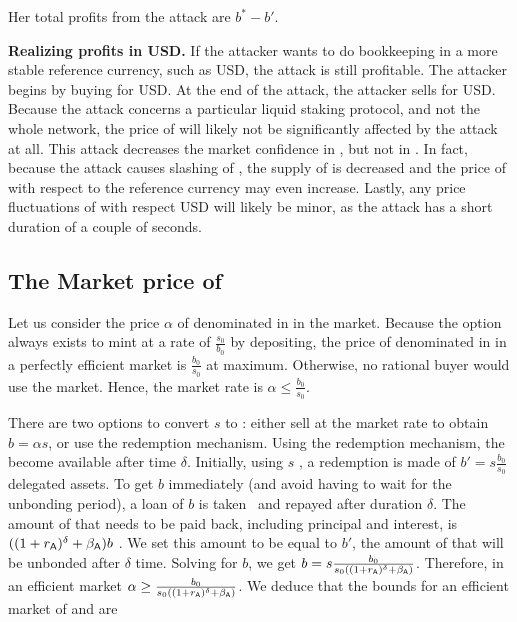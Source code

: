 Her total profits from the attack are $b^* - b'$.

\noindent
\textbf{Realizing profits in USD.}
If the attacker wants to do bookkeeping in a more stable reference currency,
such as USD, the attack is still profitable. The attacker begins by buying
\asset for USD. At the end of the attack, the attacker sells \asset for USD.
Because the attack concerns a particular liquid staking protocol, and
not the whole \asset network, the price of \asset will likely not
be significantly affected by the attack at all.
This attack decreases the market confidence in \stasset,
but not in \asset.
In fact, because
the attack causes slashing of \asset, the supply of \asset is decreased
and the price of \asset with respect to the reference currency may
even increase.
Lastly, any price fluctuations of \asset with respect USD will likely be
minor, as the attack has a short duration of a couple of seconds.



\subsection{The Market price of \stasset}\label{sec:stasset-price}

Let us consider the price $\alpha$ of \stasset denominated in \asset in the market.
Because the option always exists to mint at a rate of $\frac{s_0}{b_0}$ by
depositing, the price of \stasset denominated in \asset in a perfectly
efficient market is $\frac{b_0}{s_0}$ at maximum. Otherwise, no
rational buyer would use the market. Hence, the market rate is
$\alpha \leq \frac{b_0}{s_0}$.

There are two options to convert $s$ \stasset to \asset: either sell
at the market rate to obtain $b = \alpha s$, or use the redemption mechanism.
Using the redemption mechanism, the \assets become available after time $\delta$.
Initially, using $s$ \stasset, a redemption is made of $b' = s \frac{b_0}{s_0}$
delegated assets. To get $b$ \asset immediately (and avoid having to wait
for the unbonding period), a loan of $b$ \asset is taken~\cite{liquid-staking-report} and
repayed after duration $\delta$. The amount of \asset that needs to be paid back,
including principal and interest, is $((1 + r_{\textsf{A}})^\delta + \beta_{\textsf{A}})b$ \asset.
We set this amount to be equal to $b'$, the amount of \assets that will be
unbonded after $\delta$ time. Solving for $b$, we get
$b = s \frac{b_0}{s_0 ((1 + r_{\textsf{A}})^\delta + \beta_{\textsf{A}})}$.
Therefore, in an efficient market $\alpha \geq \frac{b_0}{s_0 ((1 + r_{\textsf{A}})^\delta + \beta_{\textsf{A}})}$.
We deduce that the bounds for an efficient market of \asset and \stasset are


